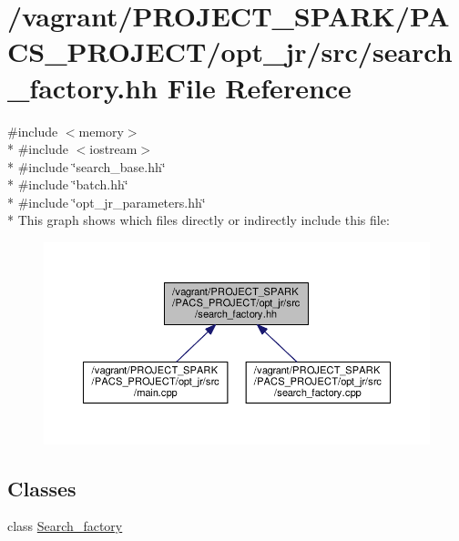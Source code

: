 \hypertarget{search__factory_8hh}{\section{/vagrant/\-P\-R\-O\-J\-E\-C\-T\-\_\-\-S\-P\-A\-R\-K/\-P\-A\-C\-S\-\_\-\-P\-R\-O\-J\-E\-C\-T/opt\-\_\-jr/src/search\-\_\-factory.hh File Reference}
\label{search__factory_8hh}
}
{\ttfamily \#include $<$memory$>$}\\*
{\ttfamily \#include $<$iostream$>$}\\*
{\ttfamily \#include \char`\"{}search\-\_\-base.\-hh\char`\"{}}\\*
{\ttfamily \#include \char`\"{}batch.\-hh\char`\"{}}\\*
{\ttfamily \#include \char`\"{}opt\-\_\-jr\-\_\-parameters.\-hh\char`\"{}}\\*
This graph shows which files directly or indirectly include this file\-:\nopagebreak
\begin{figure}[H]
\begin{center}
\leavevmode
\includegraphics[width=350pt]{search__factory_8hh__dep__incl}
\end{center}
\end{figure}
\subsection*{Classes}
\begin{DoxyCompactItemize}
\item 
class \hyperlink{classSearch__factory}{Search\-\_\-factory}
\end{DoxyCompactItemize}
